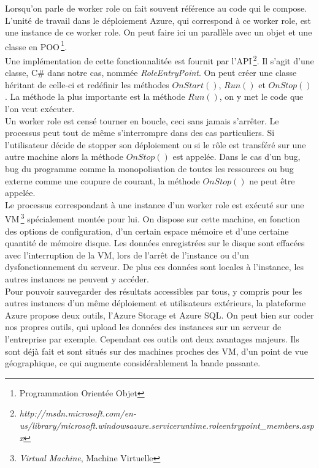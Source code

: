 Lorsqu'on parle de worker role on fait souvent référence au code qui
le compose. L'unité de travail dans le déploiement Azure, qui
correspond à ce worker role, est une instance de ce worker role.  On
peut faire ici un parallèle avec un objet et une classe en
POO\,\footnote{Programmation Orientée Objet}.\\


Une implémentation de cette fonctionnalitée est fournit par
l'API\,\footnote{\textit{http://msdn.microsoft.com/en-us/library/microsoft.windowsazure.serviceruntime.roleentrypoint\_members.aspx}}. Il
s'agit d'une classe, C\# dans notre cas, nommée
\textit{RoleEntryPoint}. On peut créer une classe héritant de celle-ci
et redéfinir les méthodes $OnStart()$, $Run()$ et $OnStop()$. La
méthode la plus importante est la méthode $Run()$, on y met le code
que l'on veut exécuter.\\

Un worker role est censé tourner en boucle, ceci sans jamais
s'arrêter. Le processus peut tout de même s'interrompre dans des cas
particuliers. Si l'utilisateur décide de stopper son déploiement ou si
le rôle est transféré sur une autre machine alors la méthode
$OnStop()$ est appelée. Dans le cas d'un bug, bug du programme comme
la monopolisation de toutes les ressources ou bug externe comme une
coupure de courant, la méthode $OnStop()$ ne peut être appelée.\\

Le processus correspondant à une instance d'un worker role est exécuté
sur une VM\,\footnote{\textit{Virtual Machine}, Machine Virtuelle}
spécialement montée pour lui. On dispose sur cette machine, en
fonction des options de configuration, d'un certain espace mémoire et
d'une certaine quantité de mémoire disque. Les données enregistrées
sur le disque sont effacées avec l'interruption de la VM, lors de
l'arrêt de l'instance ou d'un dysfonctionnement du serveur. De plus
ces données sont locales à l'instance, les autres instances ne peuvent y
accéder.\\



Pour pouvoir sauvegarder des résultats accessibles par tous, y compris
pour les autres instances d'un même déploiement et utilisateurs
extérieurs, la plateforme Azure propose deux outils, l'Azure Storage
et Azure SQL.  On peut bien sur coder nos propres outils, qui upload
les données des instances sur un serveur de l'entreprise par
exemple. Cependant ces outils ont deux avantages majeurs. Ils sont
déjà fait et sont situés sur des machines proches des VM, d'un point
de vue géographique, ce qui augmente considérablement la bande
passante.\\



